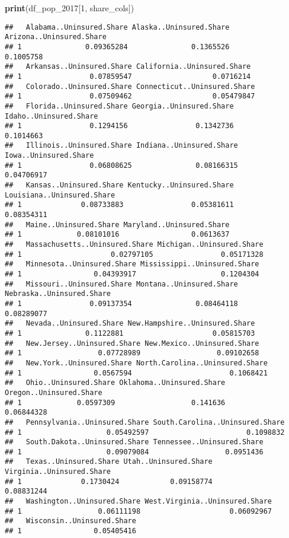 \documentclass[
]{article}
\newenvironment{Shaded}{\begin{snugshade}}{\end{snugshade}}
\newcommand{\DecValTok}[1]{\textcolor[rgb]{0.00,0.00,0.81}{#1}}
\newcommand{\FunctionTok}[1]{\textcolor[rgb]{0.13,0.29,0.53}{\textbf{#1}}}
\newcommand{\NormalTok}[1]{#1}
\begin{document}
\begin{Shaded}
\begin{Highlighting}[]
\FunctionTok{print}\NormalTok{(df\_pop\_2017[}\DecValTok{1}\NormalTok{, share\_cols])}
\end{Highlighting}
\end{Shaded}

\begin{verbatim}
##   Alabama..Uninsured.Share Alaska..Uninsured.Share Arizona..Uninsured.Share
## 1               0.09365284               0.1365526                0.1005758
##   Arkansas..Uninsured.Share California..Uninsured.Share
## 1                0.07859547                   0.0716214
##   Colorado..Uninsured.Share Connecticut..Uninsured.Share
## 1                0.07509462                   0.05479847
##   Florida..Uninsured.Share Georgia..Uninsured.Share Idaho..Uninsured.Share
## 1                0.1294156                0.1342736              0.1014663
##   Illinois..Uninsured.Share Indiana..Uninsured.Share Iowa..Uninsured.Share
## 1                0.06808625               0.08166315            0.04706917
##   Kansas..Uninsured.Share Kentucky..Uninsured.Share Louisiana..Uninsured.Share
## 1              0.08733883                0.05381611                 0.08354311
##   Maine..Uninsured.Share Maryland..Uninsured.Share
## 1             0.08101016                 0.0613637
##   Massachusetts..Uninsured.Share Michigan..Uninsured.Share
## 1                     0.02797105                0.05171328
##   Minnesota..Uninsured.Share Mississippi..Uninsured.Share
## 1                 0.04393917                    0.1204304
##   Missouri..Uninsured.Share Montana..Uninsured.Share Nebraska..Uninsured.Share
## 1                0.09137354               0.08464118                0.08289077
##   Nevada..Uninsured.Share New.Hampshire..Uninsured.Share
## 1               0.1122881                     0.05815703
##   New.Jersey..Uninsured.Share New.Mexico..Uninsured.Share
## 1                  0.07728989                  0.09102658
##   New.York..Uninsured.Share North.Carolina..Uninsured.Share
## 1                 0.0567594                       0.1068421
##   Ohio..Uninsured.Share Oklahoma..Uninsured.Share Oregon..Uninsured.Share
## 1             0.0597309                  0.141636              0.06844328
##   Pennsylvania..Uninsured.Share South.Carolina..Uninsured.Share
## 1                    0.05492597                       0.1098832
##   South.Dakota..Uninsured.Share Tennessee..Uninsured.Share
## 1                    0.09079084                  0.0951436
##   Texas..Uninsured.Share Utah..Uninsured.Share Virginia..Uninsured.Share
## 1              0.1730424            0.09158774                0.08831244
##   Washington..Uninsured.Share West.Virginia..Uninsured.Share
## 1                  0.06111198                     0.06092967
##   Wisconsin..Uninsured.Share
## 1                 0.05405416
\end{verbatim}
\end{document}
